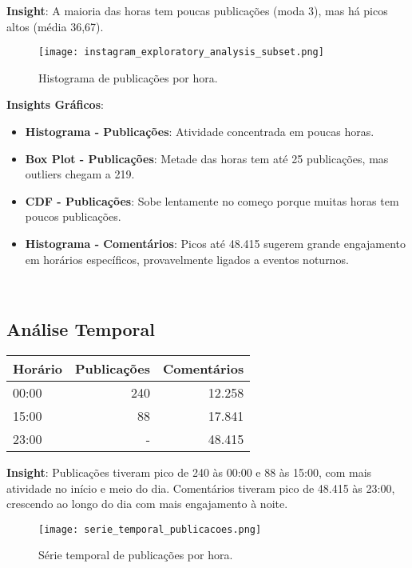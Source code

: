 \documentclass[a4paper]{article}
\begin{document}
\textbf{Insight}: A maioria das horas tem poucas publicações (moda 3), mas há picos altos (média 36,67).

\begin{figure}[htbp]
    \centering
    \texttt{[image: instagram\_exploratory\_analysis\_subset.png]}
    \caption{Histograma de publicações por hora.}
\end{figure}

\textbf{Insights Gráficos}:
\begin{itemize}
    \item \textbf{Histograma - Publicações}: Atividade concentrada em poucas horas.
    \item \textbf{Box Plot - Publicações}: Metade das horas tem até 25 publicações, mas outliers chegam a 219.
    \item \textbf{CDF - Publicações}: Sobe lentamente no começo porque muitas horas tem poucos publicações.
    \item \textbf{Histograma - Comentários}: Picos até 48.415 sugerem grande engajamento em horários específicos, provavelmente ligados a eventos noturnos.
\end{itemize}

\

\subsection{Análise Temporal}
\begin{center}
    \begin{tabular}{lrr}
        \toprule
        \textbf{Horário} & \textbf{Publicações} & \textbf{Comentários} \\
        \midrule
        00:00 & 240 & 12.258 \\
        15:00 & 88 & 17.841 \\
        23:00 & - & 48.415 \\
        \bottomrule
    \end{tabular}
\end{center}

\textbf{Insight}: Publicações tiveram pico de 240 às 00:00 e 88 às 15:00, com mais atividade no início e meio do dia. Comentários tiveram pico de 48.415 às 23:00, crescendo ao longo do dia com mais engajamento à noite.

\begin{figure}[htbp]
    \centering
    \texttt{[image: serie\_temporal\_publicacoes.png]}
    \caption{Série temporal de publicações por hora.}
\end{figure}
\end{document}
